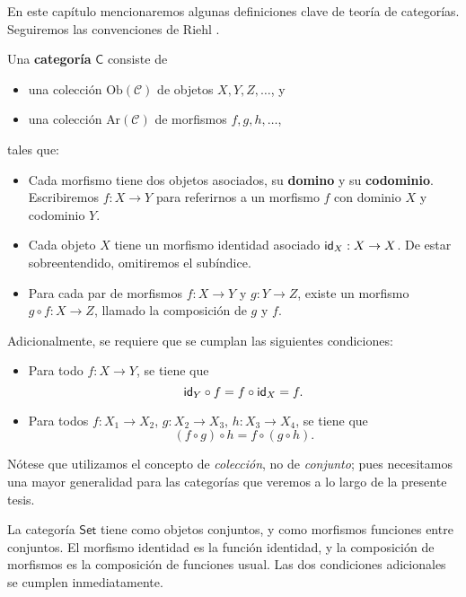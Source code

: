 \documentclass[../main.tex]{subfiles}
\begin{document}
En este cap\'itulo mencionaremos algunas definiciones clave de teor\'ia de categor\'ias.
Seguiremos las convenciones de Riehl \cite{riehl_category_2016}.

\begin{definitionap}
    Una \textbf{categor\'ia} $\mathsf{C}$ consiste de
    \begin{itemize}
        \item una colección $\text{Ob}(\mathcal{C})$ de objetos $X,Y,Z,\dots$, y
        \item una colección $\text{Ar}(\mathcal{C})$ de morfismos $f,g,h,\dots$,
    \end{itemize}
    tales que:
    \begin{itemize}
        \item Cada morfismo tiene dos objetos asociados, su \textbf{domino} y su \textbf{codominio}. Escribiremos $f:X \to Y$ para referirnos a un morfismo $f$ con dominio $X$ y codominio $Y$.
        \item Cada objeto $X$ tiene un morfismo identidad asociado $\idfunc[X]:X \to X$. De estar sobreentendido, omitiremos el sub\'indice.
        \item Para cada par de morfismos $f:X \to Y$ y $g: Y \to Z$, existe un morfismo $g \circ f: X \to Z$, llamado la composici\'on de $g$ y $f$.
    \end{itemize}
    Adicionalmente, se requiere que se cumplan las siguientes condiciones:
    \begin{itemize}
        \item Para todo $f:X \to Y$, se tiene que \[\idfunc[Y]\circ f = f \circ \idfunc[X] = f.\]
        \item Para todos $f:X_1 \to X_2$, $g:X_2 \to X_3$, $h:X_3 \to X_4$, se tiene que
              \[(f \circ g) \circ h = f \circ (g \circ h).\]
    \end{itemize}
\end{definitionap}

N\'otese que utilizamos el concepto de \textit{colecci\'on}, no de \textit{conjunto}; pues necesitamos una mayor generalidad para las categor\'ias que veremos a lo largo de la presente tesis.

\begin{exampleap}
    La categor\'ia $\mathsf{Set}$ tiene como objetos conjuntos, y como morfismos funciones entre conjuntos. El morfismo identidad es la funci\'on identidad, y la composici\'on de morfismos es la composici\'on de funciones usual. Las dos condiciones adicionales se cumplen inmediatamente.
\end{exampleap}
\end{document}
